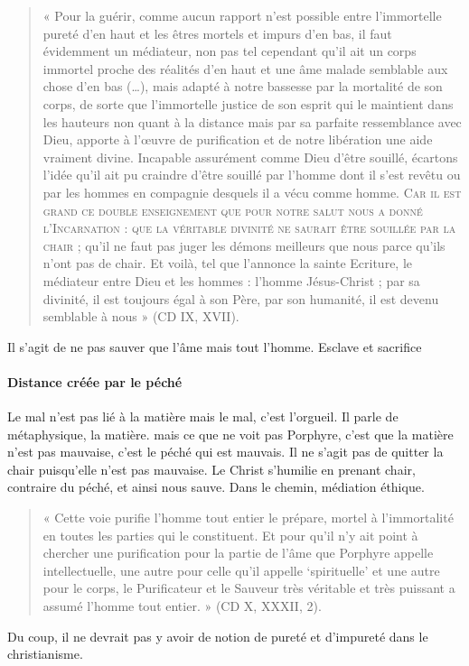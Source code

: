   \begin{quote}
      « Pour la guérir, comme aucun rapport n’est possible entre l’immortelle pureté d’en haut et les êtres mortels et impurs d’en bas,  il faut évidemment un médiateur, non pas tel cependant qu’il ait un corps immortel proche des réalités d’en haut et une âme malade semblable aux chose d’en bas (…), mais adapté à notre bassesse par la mortalité de son corps, de sorte que l’immortelle justice de son esprit qui le maintient dans les hauteurs non quant à la distance mais par sa parfaite ressemblance avec Dieu, apporte à l’œuvre de purification et de notre libération une aide vraiment divine. Incapable assurément comme Dieu d’être souillé, écartons l’idée qu’il ait pu craindre d’être souillé par l’homme dont il s’est revêtu ou par les hommes en compagnie desquels il a vécu comme homme. \textsc{Car il est grand ce double enseignement que pour notre salut nous a donné l’Incarnation : que la véritable divinité ne saurait être souillée par la chair }; qu’il ne faut pas juger les démons meilleurs que nous parce qu’ils n’ont pas de chair. Et voilà, tel que l’annonce la sainte Ecriture, le médiateur entre Dieu et les hommes : l’homme Jésus-Christ ; par sa divinité, il est toujours égal à son Père, par son humanité, il est devenu semblable à nous » (CD IX, XVII). 
  \end{quote}

Il s'agit de ne pas sauver que l'âme mais tout l'homme. Esclave et sacrifice 
\paragraph{Distance créée par le péché}
Le mal n'est pas lié à la matière mais le mal, c'est l'orgueil. Il parle de métaphysique, la matière. mais ce que ne voit pas Porphyre, c'est que la matière n'est pas mauvaise, c'est le péché qui est mauvais. Il ne s'agit pas de quitter la chair puisqu'elle n'est pas mauvaise. 
Le Christ s'humilie en prenant chair, contraire du péché, et ainsi nous sauve. Dans le chemin, médiation éthique.

\begin{quote}
    « Cette voie purifie l’homme tout entier le prépare, mortel à l’immortalité en toutes les parties qui le constituent. Et pour qu’il n’y ait point à chercher une purification pour la partie de l’âme que Porphyre appelle intellectuelle, une autre pour celle qu’il appelle ‘spirituelle’ et  une autre pour le corps, le Purificateur et le Sauveur très véritable et très puissant a assumé l’homme tout entier. » (CD X, XXXII, 2). 
\end{quote}
Du coup, il ne devrait pas y avoir de notion de pureté et d'impureté dans le christianisme.

